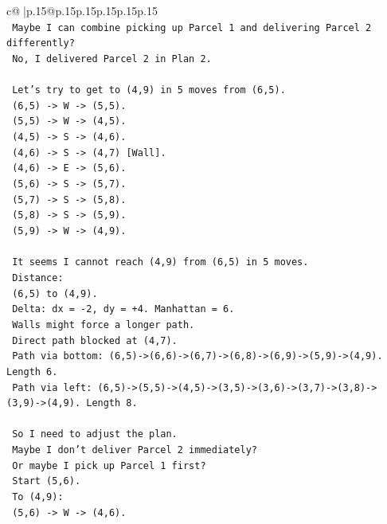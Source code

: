 \documentclass{article}
\begin{document}
{\begin{supertabular}{c@{$\;$}|p{.15\linewidth}@{}p{.15\linewidth}p{.15\linewidth}p{.15\linewidth}p{.15\linewidth}p{.15\linewidth}}
{{{\\ 
\texttt{      Maybe I can combine picking up Parcel 1 and delivering Parcel 2 differently?} \\
\texttt{      No, I delivered Parcel 2 in Plan 2.} \\
\\ 
\texttt{      Let's try to get to (4,9) in 5 moves from (6,5).} \\
\texttt{      (6,5) {-}> W {-}> (5,5).} \\
\texttt{      (5,5) {-}> W {-}> (4,5).} \\
\texttt{      (4,5) {-}> S {-}> (4,6).} \\
\texttt{      (4,6) {-}> S {-}> (4,7) {[}Wall{]}.} \\
\texttt{      (4,6) {-}> E {-}> (5,6).} \\
\texttt{      (5,6) {-}> S {-}> (5,7).} \\
\texttt{      (5,7) {-}> S {-}> (5,8).} \\
\texttt{      (5,8) {-}> S {-}> (5,9).} \\
\texttt{      (5,9) {-}> W {-}> (4,9).} \\
\\ 
\texttt{      It seems I cannot reach (4,9) from (6,5) in 5 moves.} \\
\texttt{      Distance:} \\
\texttt{      (6,5) to (4,9).} \\
\texttt{      Delta: dx = {-}2, dy = +4. Manhattan = 6.} \\
\texttt{      Walls might force a longer path.} \\
\texttt{      Direct path blocked at (4,7).} \\
\texttt{      Path via bottom: (6,5){-}>(6,6){-}>(6,7){-}>(6,8){-}>(6,9){-}>(5,9){-}>(4,9). Length 6.} \\
\texttt{      Path via left: (6,5){-}>(5,5){-}>(4,5){-}>(3,5){-}>(3,6){-}>(3,7){-}>(3,8){-}>(3,9){-}>(4,9). Length 8.} \\
\\ 
\texttt{      So I need to adjust the plan.} \\
\texttt{      Maybe I don't deliver Parcel 2 immediately?} \\
\texttt{      Or maybe I pick up Parcel 1 first?} \\
\texttt{      Start (5,6).} \\
\texttt{      To (4,9):} \\
\texttt{      (5,6) {-}> W {-}> (4,6).} \\
}}}
\end{supertabular}}
\end{document}
